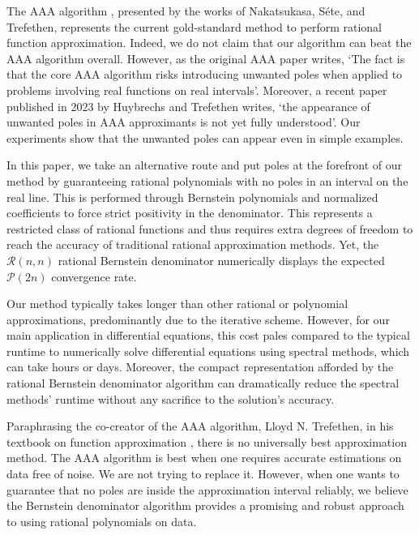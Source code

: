 \documentclass{article}
\begin{document}
The AAA algorithm \cite{AAA}, presented by the works of  Nakatsukasa, S\'ete, and Trefethen, represents the current gold-standard method to perform rational function approximation. Indeed, we do not claim that our algorithm can beat the AAA algorithm overall. However, as the original AAA paper writes, `The fact is that the core AAA algorithm risks introducing unwanted poles when applied to problems involving real functions on real intervals'. Moreover, a recent paper published in 2023 by Huybrechs and Trefethen \cite{poles_who_cares} writes, `the appearance
of unwanted poles in AAA approximants is not yet fully understood'. Our experiments show that the unwanted poles can appear even in simple examples.

In this paper, we take an alternative route and put poles at the forefront of our method by guaranteeing rational polynomials with no poles in an interval on the real line. This is performed through Bernstein polynomials and normalized coefficients to force strict positivity in the denominator. This represents a restricted class of rational functions and thus requires extra degrees of freedom to reach the accuracy of traditional rational approximation methods. Yet, the $\mathcal{R}(n,n)$ rational Bernstein denominator numerically displays the expected $\mathcal{P}(2n)$ convergence rate.

Our method typically takes longer than other rational or polynomial approximations, predominantly due to the iterative scheme. However, for our main application in differential equations, this cost pales compared to the typical runtime to numerically solve differential equations using spectral methods, which can take hours or days. Moreover, the compact representation afforded by the rational Bernstein denominator algorithm can dramatically reduce the spectral methods' runtime without any sacrifice to the solution's accuracy.


Paraphrasing the co-creator of the AAA algorithm, Lloyd N. Trefethen, in his textbook on function approximation \cite{approximation_theory_and_practice}, there is no universally best approximation method. The AAA algorithm is best when one requires accurate estimations on data free of noise. We are not trying to replace it. However, when one wants to guarantee that no poles are inside the approximation interval reliably, we believe the Bernstein denominator algorithm provides a promising and robust approach to using rational polynomials on data. 
\end{document}
